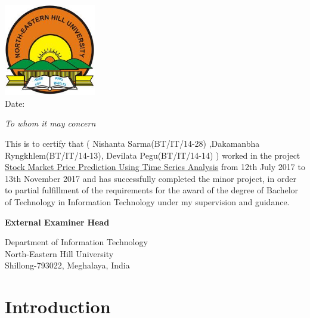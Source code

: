 \documentclass{report}
\begin{document}
\begin{center}
\vspace{0.6cm}
\includegraphics[width=4cm]{nehulogo.jpg} \\
\hspace{100mm}Date:


\vspace{10mm}\textsl {To whom it may concern}\\[0.5cm]
\end{center}
 \vspace{10mm} This is to certify that  ( Nishanta Sarma(BT/IT/14-28) ,Dakamanbha Ryngkhlem(BT/IT/14-13), 
Devilata Pegu(BT/IT/14-14) ) worked in the project \underline{Stock Market Price Prediction }\newline \underline {Using Time Series Analysis} from 12th July 2017 to 13th November 2017 and has successfully completed the minor  project, in order to partial fulfillment of the requirements for the award of the degree of Bachelor of Technology in Information Technology under my supervision and guidance.


\vfill

\begin{flushleft}
\newline
\textbf{External Examiner} \hspace{70 mm} \textbf{Head} 
\end{flushleft}

\begin{flushright}
 
Department of Information Technology \\
North-Eastern Hill University \\
Shillong-793022, Meghalaya, India \\
\end{flushright}







\tableofcontents{}

\chapter{Introduction}
\end{document}
